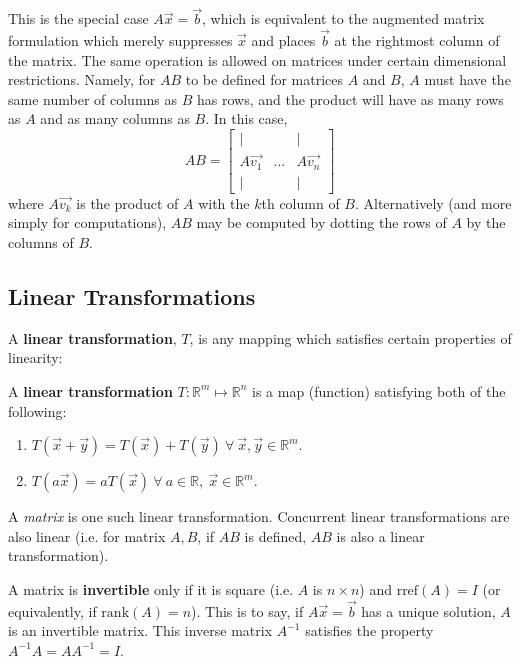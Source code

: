 This is the special case $A\vec{x} = \vec{b}$, which is equivalent to the augmented matrix formulation which merely suppresses $\vec{x}$ and places $\vec{b}$ at the rightmost column of the matrix. The same operation is allowed on matrices under certain dimensional restrictions. Namely, for $AB$ to be defined for matrices $A$ and $B$, $A$ must have the same number of columns as $B$ has rows, and the product will have as many rows as $A$ and as many columns as $B$. In this case, \[AB = \left[\begin{array}{ccc}
    | & & |\\
    A\vec{v_1} & \dots & A\vec{v_n}\\
    | & & |
\end{array}\right]\] where $A\vec{v_k}$ is the product of $A$ with the $k$th column of $B$. Alternatively (and more simply for computations), $AB$ may be computed by dotting the rows of $A$ by the columns of $B$. 

\subsection{Linear Transformations}

A \textbf{linear transformation}, $T$, is any mapping which satisfies certain properties of linearity:

\begin{shaded}
    A \textbf{linear transformation} $T:\mathbb{R}^m\mapsto\mathbb{R}^n$ is a map (function) satisfying both of the following:
    \begin{enumerate}
        \item \centering$T(\vec{x}+\vec{y}) = T(\vec{x}) + T(\vec{y})\ \forall\ \vec{x},\vec{y}\in\mathbb{R}^m$.
        \item \centering$T(a\vec{x}) = aT(\vec{x})\ \forall\ a\in\mathbb{R},\ \vec{x}\in\mathbb{R}^m$.
    \end{enumerate}
\end{shaded}

A \textit{matrix} is one such linear transformation. Concurrent linear transformations are also linear (i.e. for matrix $A,B$, if $AB$ is defined, $AB$ is also a linear transformation).

A matrix is \textbf{invertible} only if it is square (i.e. $A$ is $n\times n$) and $\text{rref}(A) = I$ (or equivalently, if $\text{rank}(A) = n$). This is to say, if $A\vec{x} = \vec{b}$ has a unique solution, $A$ is an invertible matrix. This inverse matrix $A^{-1}$ satisfies the property $A^{-1}A = AA^{-1} = I$. 

